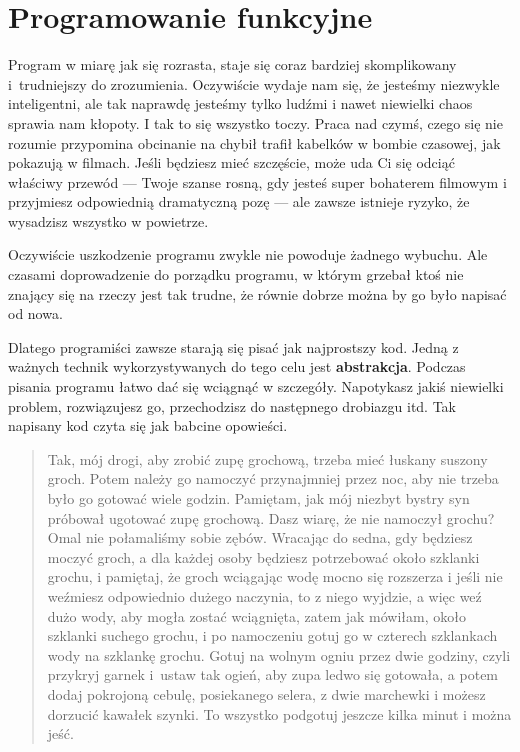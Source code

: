 \chapter{Programowanie funkcyjne}
\label{chap:6}


Program w miarę jak się rozrasta, staje się coraz bardziej skomplikowany i~trudniejszy do zrozumienia. Oczywiście wydaje nam się, że jesteśmy niezwykle inteligentni, ale tak naprawdę jesteśmy tylko ludźmi i nawet niewielki chaos sprawia nam kłopoty. I tak to się wszystko toczy.  Praca nad czymś, czego się nie rozumie przypomina obcinanie na chybił trafił kabelków w bombie czasowej, jak pokazują w filmach. Jeśli będziesz mieć szczęście, może uda Ci się odciąć właściwy przewód — Twoje szanse rosną, gdy jesteś super bohaterem filmowym i przyjmiesz odpowiednią dramatyczną pozę — ale zawsze istnieje ryzyko, że wysadzisz wszystko w powietrze.

  
Oczywiście uszkodzenie programu zwykle nie powoduje żadnego wybuchu. Ale czasami doprowadzenie do porządku programu, w którym grzebał ktoś nie znający się na rzeczy jest tak trudne, że równie dobrze można by go było napisać od nowa.

  
Dlatego programiści zawsze starają się pisać jak najprostszy kod. Jedną z ważnych technik wykorzystywanych do tego celu jest \textbf{abstrakcja}. Podczas pisania programu łatwo dać się wciągnąć w szczegóły. Napotykasz jakiś niewielki problem, rozwiązujesz go, przechodzisz do następnego drobiazgu itd. Tak napisany kod czyta się jak babcine opowieści.

  
\begin{quotation}
Tak, mój drogi, aby zrobić zupę grochową, trzeba mieć łuskany suszony groch. Potem należy go namoczyć przynajmniej przez noc, aby nie trzeba było go gotować wiele godzin. Pamiętam, jak mój niezbyt bystry syn próbował ugotować zupę grochową. Dasz wiarę, że nie namoczył grochu? Omal nie połamaliśmy sobie zębów. Wracając do sedna, gdy będziesz moczyć groch, a dla każdej osoby będziesz potrzebować około szklanki grochu, i pamiętaj, że groch wciągając wodę mocno się rozszerza i jeśli nie weźmiesz odpowiednio dużego naczynia, to z niego wyjdzie, a więc weź dużo wody, aby mogła zostać wciągnięta, zatem jak mówiłam, około szklanki suchego grochu, i po namoczeniu gotuj go w czterech szklankach wody na szklankę grochu. Gotuj na wolnym ogniu przez dwie godziny, czyli przykryj garnek i~ustaw tak ogień, aby zupa ledwo się gotowała, a potem dodaj pokrojoną cebulę, posiekanego selera, z dwie marchewki i możesz dorzucić kawałek szynki. To wszystko podgotuj jeszcze kilka minut i można jeść.
\end{quotation}
  
